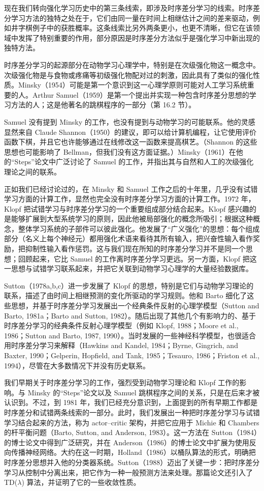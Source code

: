 \documentclass[UTF8,12pt,a4paper,fontset=fandol]{ctexart}
\begin{document}
现在我们转向强化学习历史中的第三条线索，即涉及时序差分学习的线索。时序差分学习方法的独特之处在于，它们由同一量在时间上相继估计之间的差来驱动，例如井字棋例子中的获胜概率。这条线索比另外两条更小，也更不清晰，但它在该领域中发挥了特别重要的作用，部分原因是时序差分方法似乎是强化学习中新出现的独特方法。

时序差分学习的起源部分在动物学习心理学中，特别是在次级强化物这一概念中。次级强化物是与食物或疼痛等初级强化物配对过的刺激，因此具有了类似的强化性质。Minsky（1954）可能是第一个意识到这一心理学原则可能对人工学习系统重要的人。Arthur Samuel（1959）是第一个提出并实现一种包含时序差分思想的学习方法的人；这是他著名的跳棋程序的一部分（第 16.2 节）。

Samuel 没有提到 Minsky 的工作，也没有提到与动物学习的可能联系。他的灵感显然来自 Claude Shannon（1950）的建议，即可以给计算机编程，让它使用评价函数下棋，并且它也许能够通过在线修改这一函数来提高棋艺。（Shannon 的这些思想也可能影响了 Bellman，但我们没有这方面证据。）Minsky（1961）在他的“Steps”论文中广泛讨论了 Samuel 的工作，并指出其与自然和人工的次级强化理论之间的联系。

正如我们已经讨论过的，在 Minsky 和 Samuel 工作之后的十年里，几乎没有试错学习方面的计算工作，显然也完全没有时序差分学习方面的计算工作。1972 年，Klopf 把试错学习与时序差分学习的一个重要组成部分结合起来。Klopf 感兴趣的是能够扩展到大型系统学习的原则，因此他被局部强化的概念所吸引；根据这种概念，整体学习系统的子部件可以彼此强化。他发展了“广义强化”的思想：每个组成部分（名义上每个神经元）都用强化术语来看待其所有输入，把兴奋性输入看作奖励，把抑制性输入看作惩罚。这与我们现在所知的时序差分学习并不是同一个思想；回顾起来，它比 Samuel 的工作离时序差分学习更远。另一方面，Klopf 把这一思想与试错学习联系起来，并把它关联到动物学习心理学的大量经验数据库。

Sutton（1978a,b,c）进一步发展了 Klopf 的思想，特别是它们与动物学习理论的联系，描述了由时间上相继预测的变化所驱动的学习规则。他和 Barto 细化了这些思想，并基于时序差分学习发展出一个经典条件反射的心理学模型（Sutton and Barto, 1981a；Barto and Sutton, 1982）。随后出现了其他几个有影响力的、基于时序差分学习的经典条件反射心理学模型（例如 Klopf, 1988；Moore et al., 1986；Sutton and Barto, 1987, 1990）。当时发展的一些神经科学模型，也很适合用时序差分学习来解释（Hawkins and Kandel, 1984；Byrne, Gingrich, and Baxter, 1990；Gelperin, Hopfield, and Tank, 1985；Tesauro, 1986；Friston et al., 1994），尽管在大多数情况下并没有历史联系。

我们早期关于时序差分学习的工作，强烈受到动物学习理论和 Klopf 工作的影响。与 Minsky 的“Steps”论文以及 Samuel 跳棋程序之间的关系，只是在后来才被认识到。不过，到 1981 年，我们已经充分意识到，上面提到的所有早期工作都是时序差分和试错两条线索的一部分。此时，我们发展出一种把时序差分学习与试错学习结合起来的方法，称为 actor--critic 架构，并把它应用于 Michie 和 Chambers 的杆平衡问题（Barto, Sutton, and Anderson, 1983）。这一方法在 Sutton（1984）的博士论文中得到广泛研究，并在 Anderson（1986）的博士论文中扩展为使用反向传播神经网络。大约在这一时期，Holland（1986）以桶队算法的形式，明确把时序差分思想并入他的分类器系统。Sutton（1988）迈出了关键一步：把时序差分学习从控制中分离出来，把它作为一种一般预测方法来处理。那篇论文还引入了 TD($\lambda$) 算法，并证明了它的一些收敛性质。
\end{document}
